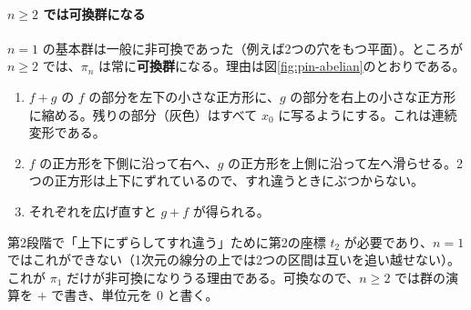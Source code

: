 \documentclass[uplatex, dvipdfmx, book]{jsbook}
\begin{document}
\paragraph{$n \ge 2$ では可換群になる}
$n = 1$ の基本群は一般に非可換であった（例えば2つの穴をもつ平面）。ところが $n \ge 2$ では、$\pi_n$ は常に\textbf{可換群}になる。理由は図\ref{fig:pin-abelian}のとおりである。
\begin{enumerate}
    \item $f + g$ の $f$ の部分を左下の小さな正方形に、$g$ の部分を右上の小さな正方形に縮める。残りの部分（灰色）はすべて $x_0$ に写るようにする。これは連続変形である。
    \item $f$ の正方形を下側に沿って右へ、$g$ の正方形を上側に沿って左へ滑らせる。2つの正方形は上下にずれているので、すれ違うときにぶつからない。
    \item それぞれを広げ直すと $g + f$ が得られる。
\end{enumerate}
第2段階で「上下にずらしてすれ違う」ために第2の座標 $t_2$ が必要であり、$n = 1$ ではこれができない（1次元の線分の上では2つの区間は互いを追い越せない）。これが $\pi_1$ だけが非可換になりうる理由である。可換なので、$n \ge 2$ では群の演算を $+$ で書き、単位元を $0$ と書く。
\end{document}
